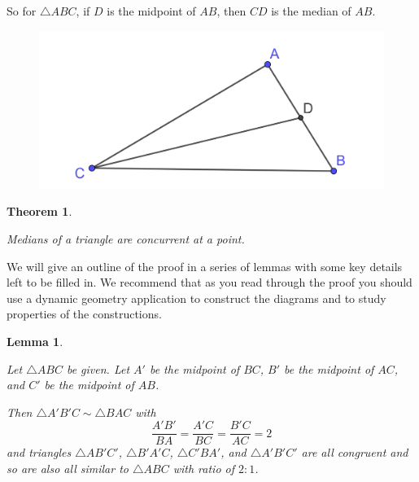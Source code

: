 \documentclass[
]{book}
\newtheorem{theorem}{Theorem}[chapter]
\newtheorem{lemma}{Lemma}[chapter]
\theoremstyle{definition}
\theoremstyle{definition}
\theoremstyle{definition}
\theoremstyle{definition}
\theoremstyle{remark}
\begin{document}
So for \(\triangle ABC\), if \(D\) is the midpoint of \(AB\), then \(CD\) is the median of \(AB\).

\begin{figure}

{\centering \includegraphics[width=0.3\linewidth]{images/median} 

}

\end{figure}

\begin{theorem}
\protect\hypertarget{thm:unlabeled-div-180}{}\label{thm:unlabeled-div-180}

Medians of a triangle are concurrent at a point.

\end{theorem}

We will give an outline of the proof in a series of lemmas with some key details left to be filled in. We recommend that as you read through the proof you should use a dynamic geometry application to construct the diagrams and to study properties of the constructions.

\begin{lemma}
\protect\hypertarget{lem:unlabeled-div-181}{}\label{lem:unlabeled-div-181}

Let \(\triangle ABC\) be given. Let \(A'\) be the midpoint of \(BC\), \(B'\) be the midpoint of \(AC\), and \(C'\) be the midpoint of \(AB\).

Then \(\triangle A'B'C\sim \triangle BAC\) with \[\frac{A'B'}{BA}= \frac{A'C}{BC} = \frac{B'C}{AC}=2\] and triangles \(\triangle AB'C'\), \(\triangle B'A'C\), \(\triangle C'BA'\), and \(\triangle A'B'C'\) are all congruent and so are also all similar to \(\triangle ABC\) with ratio of \(2:1\).

\end{lemma}
\end{document}
